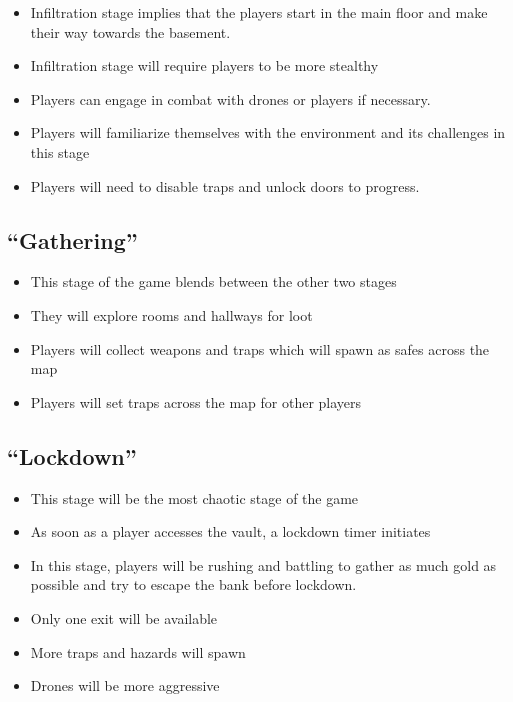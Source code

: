 \documentclass[10pt]{report}
\begin{document}
\begin{itemize}
    \item Infiltration stage implies that the players start in the main floor and make their way towards the basement.
    \item Infiltration stage will require players to be more stealthy
    \item Players can engage in combat with drones or players if necessary.
    \item Players will familiarize themselves with the environment and its challenges in this stage
    \item Players will need to disable traps and unlock doors to progress.    
\end{itemize}

\subsection{``Gathering''}

\begin{itemize}
    \item This stage of the game blends between the other two stages
    \item They will explore rooms and hallways for loot
    \item Players will collect weapons and traps which will spawn as safes across the map
    \item Players will set traps across the map for other players     
\end{itemize}

\subsection{``Lockdown''}

\begin{itemize}
    \item This stage will be the most chaotic stage of the game
    \item As soon as a player accesses the vault, a lockdown timer initiates
    \item In this stage, players will be rushing and battling to gather as much gold as possible and try to escape the bank before lockdown.
    \item Only one exit will be available
    \item More traps and hazards will spawn
    \item Drones will be more aggressive
\end{itemize}
\end{document}
